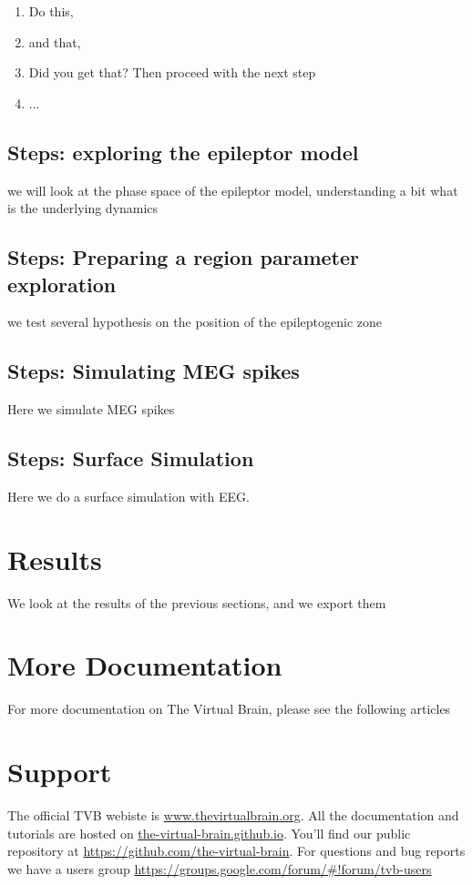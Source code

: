 \documentclass{tufte-handout}
\begin{document}
\begin{enumerate}
\item Do this,
\item and that,
\item Did you get that? Then proceed with the next step
\item ...
\end{enumerate}

\subsection{Steps: exploring the epileptor model}\label{sec:epileptor}

we will look at the phase space of the epileptor model, understanding a bit what is the underlying dynamics

\subsection{Steps: Preparing a region parameter exploration }

we test several hypothesis on the position of the epileptogenic zone

\subsection{Steps: Simulating MEG spikes}

Here we simulate MEG spikes

\subsection{Steps: Surface Simulation}
Here we do a surface simulation with EEG.

\section{Results}\label{sec:results}

We look at the results of the previous sections, and we export them

\section{More Documentation}\label{sec:more-doc}
For more documentation on The Virtual Brain, please see the following articles \cite{Sanz-Leon_2013, Spiegler_2013, Jirsa_2010b}


\section{Support}\label{sec:support}

The official TVB webiste is \url{www.thevirtualbrain.org}.  
All the documentation and tutorials are hosted on \url{the-virtual-brain.github.io}.
You'll find our public  repository at \url{https://github.com/the-virtual-brain}. For questions and bug reports we have a users group \url{https://groups.google.com/forum/#!forum/tvb-users}



\end{document}
